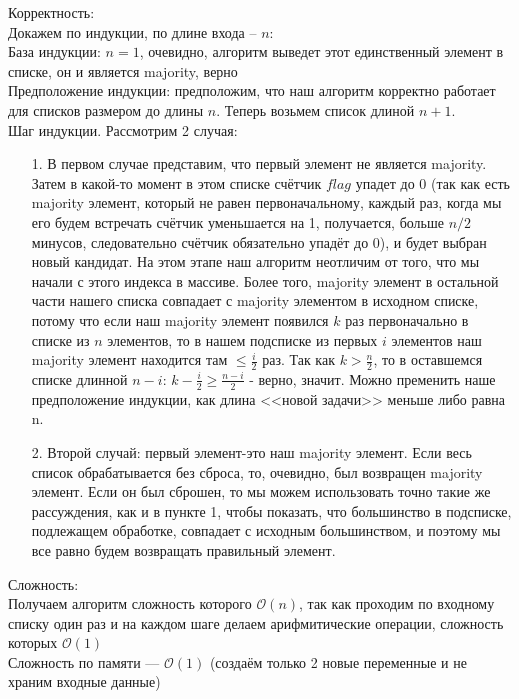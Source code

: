 \documentclass[a4paper,12pt]{article} %
\begin{document}
Корректность:\\
Докажем по индукции, по длине входа -- $ n $:\\
База индукции: $ n = 1 $, очевидно, алгоритм выведет этот единственный элемент в списке, он и является majority, верно\\
Предположение индукции: предположим, что наш алгоритм корректно работает для списков размером до длины $n$. Теперь возьмем список длиной $n + 1$.\\
Шаг индукции. Рассмотрим 2 случая:
\begin{itemize}
\item[1.] В первом случае представим, что первый элемент не является majority. Затем в какой-то момент в этом списке счётчик $flag$ упадет до 0 (так как есть majority элемент, который не равен первоначальному, каждый раз, когда мы его будем встречать счётчик уменьшается на 1, получается, больше $n/2$ минусов, следовательно счётчик обязательно упадёт до 0), и будет выбран новый кандидат. На этом этапе наш алгоритм неотличим от того, что мы начали с этого индекса в массиве. Более того, majority элемент в остальной части нашего списка совпадает с majority элементом в исходном списке, потому что если наш majority элемент появился $k$ раз первоначально в списке из $n$ элементов, то в нашем подсписке из первых $i$ элементов наш majority элемент находится там $\leqslant \frac{i}{2}$ раз. Так как $k > \frac{n}{2}$, то в оставшемся списке длинной $n - i$: 
$k - \frac{i}{2} \geqslant \frac{n - i}{2}$ - верно, значит. Можно пременить наше предположение индукции, как длина <<новой задачи>> меньше либо равна n.

\item[2.] Второй случай: первый элемент-это наш majority элемент. Если весь список обрабатывается без сброса, то, очевидно, был возвращен majority элемент. Если он был сброшен, то мы можем использовать точно такие же рассуждения, как и в пункте 1, чтобы показать, что большинство в подсписке, подлежащем обработке, совпадает с исходным большинством, и поэтому мы все равно будем возвращать правильный элемент.
\end{itemize}

Сложность:\\
Получаем алгоритм сложность которого $\mathcal{O}(n)$, так как проходим по входному списку один раз и на каждом шаге делаем арифмитические операции, сложность которых $\mathcal{O}(1)$\\ 
Сложность по памяти — $\mathcal{O}(1)$ (создаём только 2 новые переменные и не храним входные данные) \\
\end{document}
